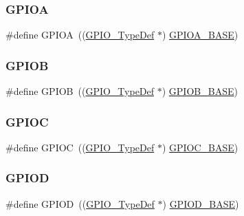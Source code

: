 \subsubsection{\texorpdfstring{GPIOA}{GPIOA}}
{\footnotesize\ttfamily \#define G\+P\+I\+OA~((\mbox{\hyperlink{struct_g_p_i_o___type_def}{G\+P\+I\+O\+\_\+\+Type\+Def}} $\ast$) \mbox{\hyperlink{group___peripheral__memory__map_gad7723846cc5db8e43a44d78cf21f6efa}{G\+P\+I\+O\+A\+\_\+\+B\+A\+SE}})}

\mbox{\label{group___peripheral__declaration_ga68b66ac73be4c836db878a42e1fea3cd}} 
\subsubsection{\texorpdfstring{GPIOB}{GPIOB}}
{\footnotesize\ttfamily \#define G\+P\+I\+OB~((\mbox{\hyperlink{struct_g_p_i_o___type_def}{G\+P\+I\+O\+\_\+\+Type\+Def}} $\ast$) \mbox{\hyperlink{group___peripheral__memory__map_gac944a89eb789000ece920c0f89cb6a68}{G\+P\+I\+O\+B\+\_\+\+B\+A\+SE}})}

\mbox{\label{group___peripheral__declaration_ga2dca03332d620196ba943bc2346eaa08}} 
\subsubsection{\texorpdfstring{GPIOC}{GPIOC}}
{\footnotesize\ttfamily \#define G\+P\+I\+OC~((\mbox{\hyperlink{struct_g_p_i_o___type_def}{G\+P\+I\+O\+\_\+\+Type\+Def}} $\ast$) \mbox{\hyperlink{group___peripheral__memory__map_ga26f267dc35338eef219544c51f1e6b3f}{G\+P\+I\+O\+C\+\_\+\+B\+A\+SE}})}

\mbox{\label{group___peripheral__declaration_ga7580b1a929ea9df59725ba9c18eba6ac}} 
\subsubsection{\texorpdfstring{GPIOD}{GPIOD}}
{\footnotesize\ttfamily \#define G\+P\+I\+OD~((\mbox{\hyperlink{struct_g_p_i_o___type_def}{G\+P\+I\+O\+\_\+\+Type\+Def}} $\ast$) \mbox{\hyperlink{group___peripheral__memory__map_ga1a93ab27129f04064089616910c296ec}{G\+P\+I\+O\+D\+\_\+\+B\+A\+SE}})}


